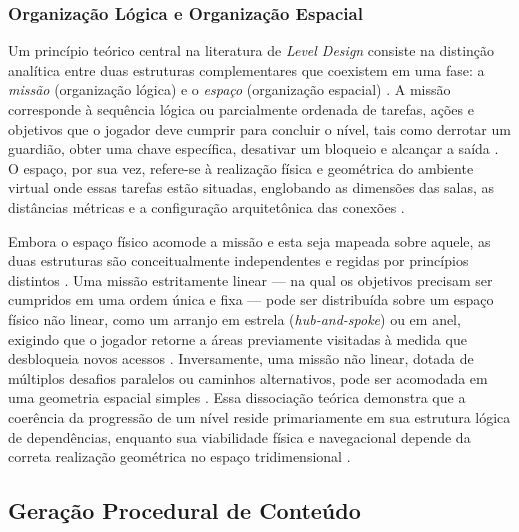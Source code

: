 \subsubsection{Organização Lógica e Organização Espacial}
\label{sec:organizacao_logica_espacial}

Um princípio teórico central na literatura de \textit{Level Design} consiste na distinção analítica entre duas estruturas complementares que coexistem em uma fase: a \textit{missão} (organização lógica) e o \textit{espaço} (organização espacial) \cite{dormans2010, linden2014dungeons}. A missão corresponde à sequência lógica ou parcialmente ordenada de tarefas, ações e objetivos que o jogador deve cumprir para concluir o nível, tais como derrotar um guardião, obter uma chave específica, desativar um bloqueio e alcançar a saída \cite{dormans2010, inproceedings}. O espaço, por sua vez, refere-se à realização física e geométrica do ambiente virtual onde essas tarefas estão situadas, englobando as dimensões das salas, as distâncias métricas e a configuração arquitetônica das conexões \cite{dormans2010, linden2014dungeons}.

Embora o espaço físico acomode a missão e esta seja mapeada sobre aquele, as duas estruturas são conceitualmente independentes e regidas por princípios distintos \cite{dormans2010}. Uma missão estritamente linear --- na qual os objetivos precisam ser cumpridos em uma ordem única e fixa --- pode ser distribuída sobre um espaço físico não linear, como um arranjo em estrela (\textit{hub-and-spoke}) ou em anel, exigindo que o jogador retorne a áreas previamente visitadas à medida que desbloqueia novos acessos \cite{dormans2010}. Inversamente, uma missão não linear, dotada de múltiplos desafios paralelos ou caminhos alternativos, pode ser acomodada em uma geometria espacial simples \cite{dormans2010, inproceedings}. Essa dissociação teórica demonstra que a coerência da progressão de um nível reside primariamente em sua estrutura lógica de dependências, enquanto sua viabilidade física e navegacional depende da correta realização geométrica no espaço tridimensional \cite{dormans2010, inproceedings, linden2014dungeons}.

\subsection{Geração Procedural de Conteúdo}
\label{sec:pcg}


